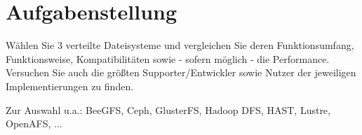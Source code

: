 
\section{Aufgabenstellung}
Wählen Sie 3 verteilte Dateisysteme und vergleichen Sie deren Funktionsumfang, Funktionsweise, Kompatibilitäten sowie - sofern möglich - die Performance. Versuchen Sie auch die größten Supporter/Entwickler sowie Nutzer der jeweiligen Implementierungen zu finden.

Zur Auswahl u.a.: BeeGFS, Ceph, GlusterFS, Hadoop DFS, HAST, Lustre, OpenAFS, ...
